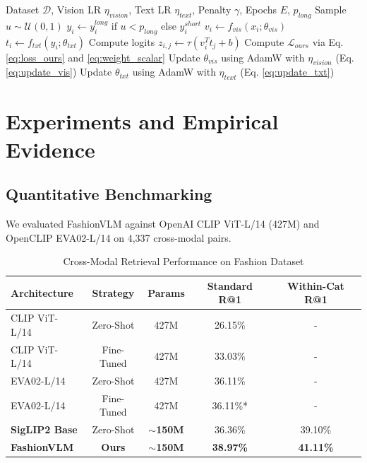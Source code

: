 \documentclass[12pt, a4paper]{article}
\begin{document}
\begin{algorithm}[htbp]
\caption{FashionVLM Training Loop}
\label{alg:training}
\begin{algorithmic}[1]
\REQUIRE Dataset $\mathcal{D}$, Vision LR $\eta_{vision}$, Text LR $\eta_{text}$, Penalty $\gamma$, Epochs $E$, $p_{long}$
        \STATE Sample $u \sim \mathcal{U}(0,1)$
        \STATE $y_i \leftarrow y_i^{long}$ if $u < p_{long}$ else $y_i^{short}$
        \STATE $v_i \leftarrow f_{vis}(x_i; \theta_{vis})$
        \STATE $t_i \leftarrow f_{txt}(y_i; \theta_{txt})$
        \STATE Compute logits $z_{i,j} \leftarrow \tau (v_i^T t_j + b)$
        \STATE Compute $\mathcal{L}_{ours}$ via Eq. \ref{eq:loss_ours} and \ref{eq:weight_scalar}
        \STATE Update $\theta_{vis}$ using AdamW with $\eta_{vision}$ (Eq. \ref{eq:update_vis})
        \STATE Update $\theta_{txt}$ using AdamW with $\eta_{text}$ (Eq. \ref{eq:update_txt})
    \ENDFOR
\ENDFOR
\end{algorithmic}
\end{algorithm}

\section{Experiments and Empirical Evidence}

\subsection{Quantitative Benchmarking}
We evaluated FashionVLM against OpenAI CLIP ViT-L/14 (427M) and OpenCLIP EVA02-L/14 on 4,337 cross-modal pairs. 

\begin{table}[htbp]
\caption{Cross-Modal Retrieval Performance on Fashion Dataset}
\label{tab:results}
\centering
\begin{tabular}{@{}lcccc@{}}
\toprule
\textbf{Architecture} & \textbf{Strategy} & \textbf{Params} & \textbf{Standard R@1} & \textbf{Within-Cat R@1} \\ \midrule
CLIP ViT-L/14 & Zero-Shot & 427M & 26.15\% & - \\
CLIP ViT-L/14 & Fine-Tuned & 427M & 33.03\% & - \\
EVA02-L/14 & Zero-Shot & 427M & 36.11\% & - \\
EVA02-L/14 & Fine-Tuned & 427M & 36.11\%* & - \\
\textbf{SigLIP2 Base} & Zero-Shot & \textbf{$\sim$150M} & 36.36\% & 39.10\% \\
\textbf{FashionVLM} & \textbf{Ours} & \textbf{$\sim$150M} & \textbf{38.97\%} & \textbf{41.11\%} \\ \bottomrule
\end{tabular}
\end{table}
\end{document}
